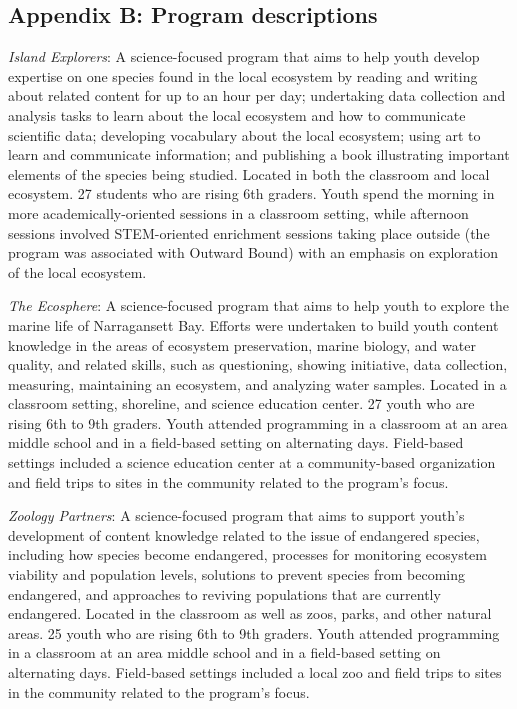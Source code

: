 \documentclass[]{book}
\theoremstyle{definition}
\theoremstyle{definition}
\theoremstyle{definition}
\theoremstyle{remark}
\begin{document}
\subsection{Appendix B: Program
descriptions}\label{appendix-b-program-descriptions}

\emph{Island Explorers}: A science-focused program that aims to help
youth develop expertise on one species found in the local ecosystem by
reading and writing about related content for up to an hour per day;
undertaking data collection and analysis tasks to learn about the local
ecosystem and how to communicate scientific data; developing vocabulary
about the local ecosystem; using art to learn and communicate
information; and publishing a book illustrating important elements of
the species being studied. Located in both the classroom and local
ecosystem. 27 students who are rising 6th graders. Youth spend the
morning in more academically-oriented sessions in a classroom setting,
while afternoon sessions involved STEM-oriented enrichment sessions
taking place outside (the program was associated with Outward Bound)
with an emphasis on exploration of the local ecosystem.

\emph{The Ecosphere}: A science-focused program that aims to help youth
to explore the marine life of Narragansett Bay. Efforts were undertaken
to build youth content knowledge in the areas of ecosystem preservation,
marine biology, and water quality, and related skills, such as
questioning, showing initiative, data collection, measuring, maintaining
an ecosystem, and analyzing water samples. Located in a classroom
setting, shoreline, and science education center. 27 youth who are
rising 6th to 9th graders. Youth attended programming in a classroom at
an area middle school and in a field-based setting on alternating days.
Field-based settings included a science education center at a
community-based organization and field trips to sites in the community
related to the program's focus.

\emph{Zoology Partners}: A science-focused program that aims to support
youth's development of content knowledge related to the issue of
endangered species, including how species become endangered, processes
for monitoring ecosystem viability and population levels, solutions to
prevent species from becoming endangered, and approaches to reviving
populations that are currently endangered. Located in the classroom as
well as zoos, parks, and other natural areas. 25 youth who are rising
6th to 9th graders. Youth attended programming in a classroom at an area
middle school and in a field-based setting on alternating days.
Field-based settings included a local zoo and field trips to sites in
the community related to the program's focus.
\end{document}
